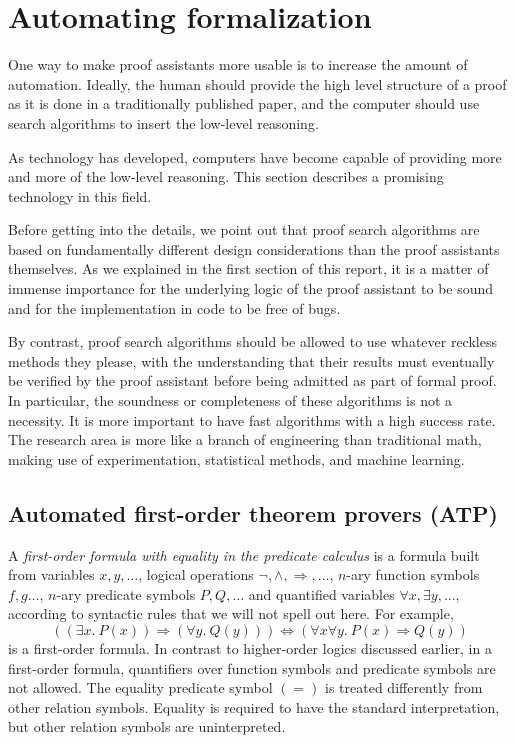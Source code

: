 \documentclass[brochure,english,12pt]{bourbaki}
\theoremstyle{plain}
\begin{document}
\section{Automating formalization}

One way to make proof assistants more usable is to increase the amount of
automation.   Ideally, the human should provide the high level structure of a proof
as it is done in a traditionally published paper, and the computer should use
search algorithms to insert the low-level reasoning.   

As technology has developed, computers have become capable of providing
more and more of the low-level reasoning.   This section describes a 
 promising technology in this field.

Before getting into the details, we point out that proof search algorithms
are based on fundamentally different design considerations than the proof
assistants themselves.  As we explained in the first section of this report, it is a matter of
immense importance for the underlying logic of the proof assistant to be sound
and for the implementation in code to be free of bugs.  

By contrast, proof search algorithms should be allowed to use whatever
reckless methods they please, with the understanding that their results must
eventually be verified by  the proof assistant before being admitted as part of
formal proof.  In particular, the soundness or completeness of these algorithms
is not a necessity.  It is more important to have fast algorithms with a high
success rate.  The research area is more like a branch of engineering than traditional
math, making use of 
experimentation, statistical methods, and machine learning.



\subsection{Automated first-order theorem provers (ATP)}


A {\it first-order formula with equality in the predicate calculus} is a formula built
from variables $x,y,\ldots$, logical operations $\neg, \land, \Rightarrow,\ldots$, $n$-ary function symbols $f,g\ldots$, 
 $n$-ary predicate symbols $P, Q,\ldots$  and quantified variables $\forall x, \exists y,\ldots$,
according to syntactic rules that we will not spell out here.     For example,
\[
((\exists x.~P(x)) \Rightarrow (\forall y.~Q(y))) \Leftrightarrow (\forall x\forall y.~P(x)\Rightarrow Q(y))
\]
is a first-order formula.
In contrast to higher-order logics discussed earlier, in a first-order formula,
quantifiers over function symbols and predicate symbols are not allowed.
The equality predicate  symbol $(=)$ is treated differently from other relation symbols.  Equality is required to have the
standard interpretation, but other relation symbols are uninterpreted.
\end{document}
